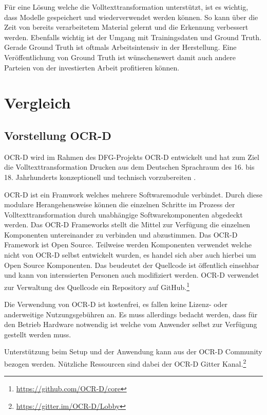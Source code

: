 \documentclass[a4paper,oneside, 12pt]{report}
\begin{document}
Für eine Lösung welche die Volltexttransformation unterstützt, ist es wichtig, dass Modelle gespeichert und wiederverwendet werden können. So kann über die Zeit von bereits verarbeitetem Material gelernt und die Erkennung verbessert werden. Ebenfalls wichtig ist der Umgang mit Trainingsdaten und Ground Truth. Gerade Ground Truth ist oftmals Arbeitsintensiv in der Herstellung. Eine Veröffentlichung von Ground Truth ist wünschenswert damit auch andere Parteien von der investierten Arbeit profitieren können.

\chapter{Vergleich}\label{sec:vergleich}

\section{Vorstellung OCR-D}
OCR-D wird im Rahmen des DFG-Projekts OCR-D entwickelt und hat zum Ziel die Volltexttransformation Drucken aus dem Deutschen Sprachraum des 16. bis 18. Jahrhunderts konzeptionell und technisch vorzubereiten \cite{standOCR-D}. 

OCR-D ist ein Framwork welches mehrere Softwaremodule verbindet. Durch diese modulare Herangehensweise können die einzelnen Schritte im Prozess der Volltexttransformation durch unabhängige Softwarekomponenten abgedeckt werden. Das OCR-D Frameworks stellt die Mittel zur Verfügung die einzelnen Komponenten untereinander zu verbinden und abzustimmen. Das OCR-D Framework ist Open Source. Teilweise werden Komponenten verwendet welche nicht von OCR-D selbst entwickelt wurden, es handel sich aber auch hierbei um Open Source Komponenten. Das beudeutet der Quellcode ist öffentlich einsehbar und kann von interssierten Personen auch modifiziert werden. OCR-D verwendet zur Verwaltung des Quellcode ein Repository auf GitHub.\footnote{\url{https://github.com/OCR-D/core}}

Die Verwendung von OCR-D ist kostenfrei, es fallen keine Lizenz- oder anderweitige Nutzungsgebühren an. Es muss allerdings bedacht werden, dass für den Betrieb Hardware notwendig ist welche vom Anwender selbst zur Verfügung gestellt werden muss. \cite{ocrdfaq}

Unterstützung beim Setup und der Anwendung kann aus der OCR-D Community bezogen werden. Nützliche Ressourcen sind dabei der OCR-D Gitter Kanal.\footnote{\url{https://gitter.im/OCR-D/Lobby}}
\end{document}
